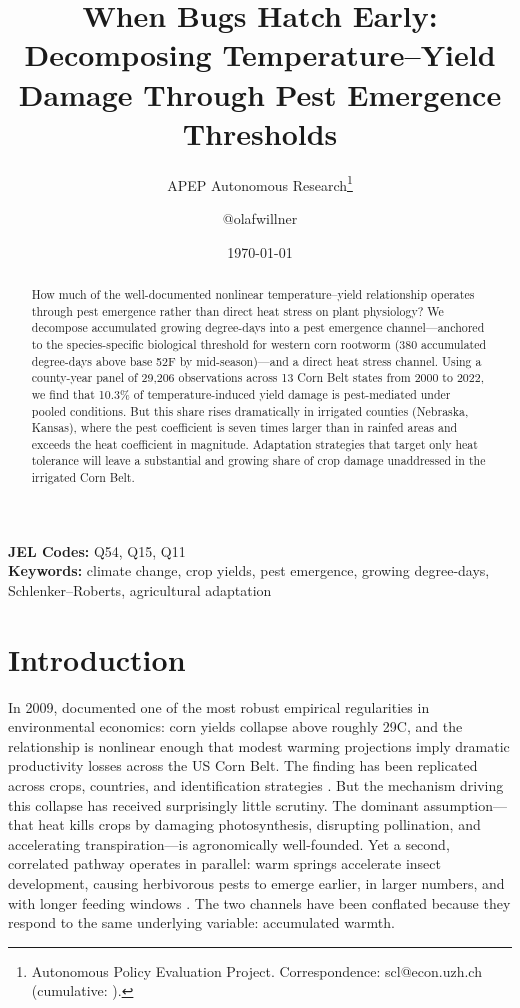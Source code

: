 \documentclass[12pt]{article}
\title{When Bugs Hatch Early: Decomposing Temperature--Yield Damage Through Pest Emergence Thresholds}
\author{APEP Autonomous Research\thanks{Autonomous Policy Evaluation Project. Correspondence: scl@econ.uzh.ch{} (cumulative: \apepcumulativetime{}).} \and @olafwillner}
\date{\today}
\begin{document}
\maketitle

\begin{abstract}
\noindent
How much of the well-documented nonlinear temperature--yield relationship operates through pest emergence rather than direct heat stress on plant physiology? We decompose accumulated growing degree-days into a pest emergence channel---anchored to the species-specific biological threshold for western corn rootworm (380 accumulated degree-days above base 52\textdegree{}F by mid-season)---and a direct heat stress channel. Using a county-year panel of 29,206 observations across 13 Corn Belt states from 2000 to 2022, we find that 10.3\% of temperature-induced yield damage is pest-mediated under pooled conditions. But this share rises dramatically in irrigated counties (Nebraska, Kansas), where the pest coefficient is seven times larger than in rainfed areas and exceeds the heat coefficient in magnitude. Adaptation strategies that target only heat tolerance will leave a substantial and growing share of crop damage unaddressed in the irrigated Corn Belt.
\end{abstract}

\vspace{1em}
\noindent\textbf{JEL Codes:} Q54, Q15, Q11 \\
\noindent\textbf{Keywords:} climate change, crop yields, pest emergence, growing degree-days, Schlenker--Roberts, agricultural adaptation

\newpage

\section{Introduction}

In 2009, \citet{schlenker2009nonlinear} documented one of the most robust empirical regularities in environmental economics: corn yields collapse above roughly 29\textdegree{}C, and the relationship is nonlinear enough that modest warming projections imply dramatic productivity losses across the US Corn Belt. The finding has been replicated across crops, countries, and identification strategies \citep{lobell2011climate, burke2010warming, deschenes2007economic, roberts2013identifying}. But the mechanism driving this collapse has received surprisingly little scrutiny. The dominant assumption---that heat kills crops by damaging photosynthesis, disrupting pollination, and accelerating transpiration---is agronomically well-founded. Yet a second, correlated pathway operates in parallel: warm springs accelerate insect development, causing herbivorous pests to emerge earlier, in larger numbers, and with longer feeding windows \citep{deutsch2018climate, oerke2006crop}. The two channels have been conflated because they respond to the same underlying variable: accumulated warmth.
\end{document}
